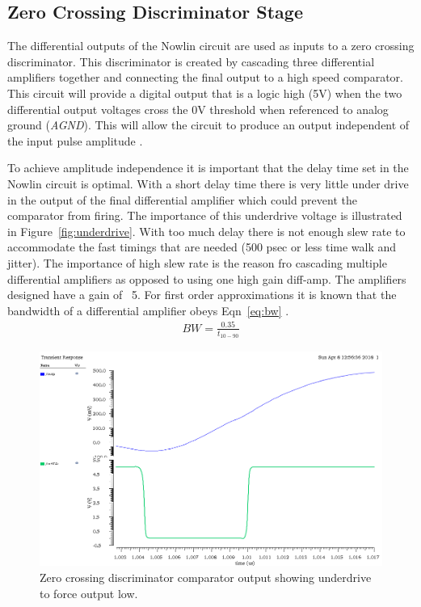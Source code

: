 \documentclass[12pt,oneside,final]{siuethesis}
\theoremstyle{definition}
\begin{document}
\subsection{Zero Crossing Discriminator Stage}
\par The differential outputs of the Nowlin circuit are used as inputs to a zero crossing discriminator. This discriminator is created by cascading three differential amplifiers together and connecting the final output to a high speed comparator. This circuit will provide a digital output that is a logic high (5V) when the two differential output voltages cross the 0V threshold when referenced to analog ground (\emph{AGND}). This will allow the circuit to produce an output independent of the input pulse amplitude \cite{CFD}. 
\par To achieve amplitude independence it is important that the delay time set in the Nowlin circuit is optimal. With a short delay time there is very little under drive in the output of the final differential amplifier which could prevent the comparator from firing. The importance of this underdrive voltage is illustrated in Figure~\ref{fig:underdrive}. With too much delay there is not enough slew rate to accommodate the fast timings that are needed (500 psec or less time walk and jitter). The importance of high slew rate is the reason fro cascading multiple differential amplifiers as opposed to using one high gain diff-amp. The amplifiers designed have a gain of ~5. For first order approximations it is known that the bandwidth of a differential amplifier obeys Eqn~\ref{eq:bw} \cite{CFD}.
\begin{eqnarray}
BW = \frac{0.35}{t_{10-90}}
\label{eq:bw}
\end{eqnarray}
\begin{figure}[ht]
\centering
\includegraphics[scale=.4,keepaspectratio=true]{images/zcd_out.png} 
\caption{Zero crossing discriminator comparator output showing underdrive to force output low.}
\label{fig:ZCD}
\end{figure}
\end{document}
